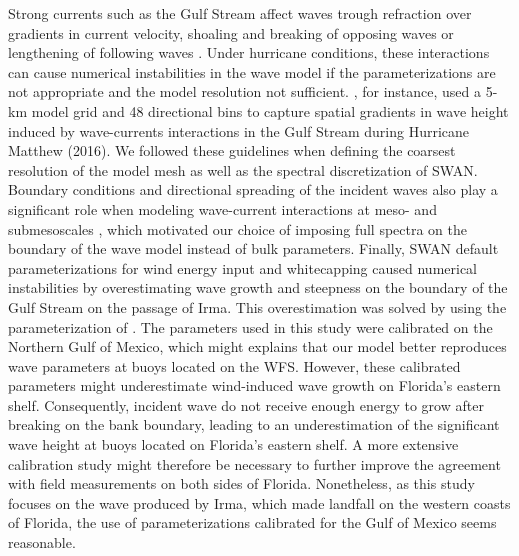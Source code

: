 \documentclass[preprint,12pt,authoryear]{elsarticle}
\begin{document}
Strong currents such as the Gulf Stream affect waves trough refraction over gradients in current velocity, shoaling and breaking of opposing waves or lengthening of following waves \citep{hegermiller2019wave}. Under hurricane conditions, these interactions can cause numerical instabilities in the wave model if the parameterizations are not appropriate and the model resolution not sufficient. \cite{hegermiller2019wave}, for instance, used a 5-km model grid and 48 directional bins to capture spatial gradients in wave height induced by wave-currents interactions in the Gulf Stream during Hurricane Matthew (2016). We followed these guidelines when defining the coarsest resolution of the model mesh as well as the spectral discretization of SWAN. Boundary conditions and directional spreading of the incident waves also play a significant role when modeling wave-current interactions at meso- and submesoscales \citep{villas2020wave}, which motivated our choice of imposing full spectra on the boundary of the wave model instead of bulk parameters. Finally, SWAN default parameterizations for wind energy input and whitecapping caused numerical instabilities by overestimating wave growth and steepness on the boundary of the Gulf Stream on the passage of Irma. This overestimation was solved by using the parameterization of \cite{siadatmousavi2011evaluation}. The parameters used in this study were calibrated on the Northern Gulf of Mexico, which might explains that our model better reproduces wave parameters at buoys located on the WFS. However, these calibrated parameters might underestimate wind-induced wave growth on Florida's eastern shelf. Consequently, incident wave do not receive enough energy to grow after breaking on the bank boundary, leading to an underestimation of the significant wave height at buoys located on Florida's eastern shelf. A more extensive calibration study might therefore be necessary to further improve the agreement with field measurements on both sides of Florida. Nonetheless, as this study focuses on the wave produced by Irma, which made landfall on the western coasts of Florida, the use of parameterizations calibrated for the Gulf of Mexico seems reasonable.
\end{document}
